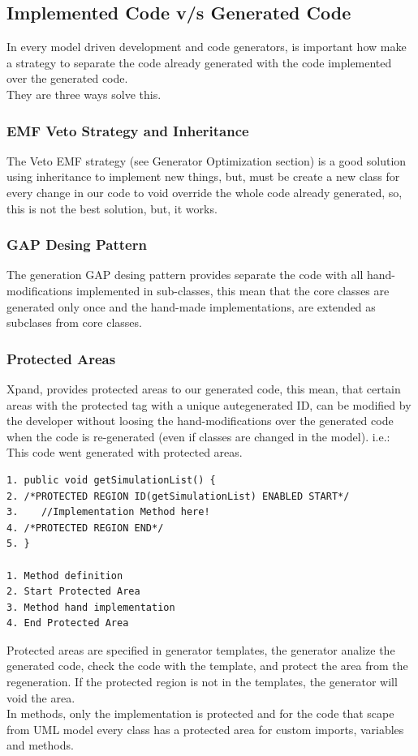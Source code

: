 \subsection{Implemented Code v/s Generated Code}
In every model driven development and code generators, is important how make a
strategy to separate the code already generated with the code implemented over
the generated code.\\
They are three ways solve this.

\subsubsection{EMF Veto Strategy and Inheritance}
The Veto EMF strategy (see Generator Optimization section) is a good solution
using inheritance to implement new things, but, must be create a new class for every change in our code to void
override the whole code already generated, so, this is not the best solution,
but, it works.

\subsubsection{GAP Desing Pattern}
The generation GAP desing pattern provides separate the code with all
hand-modifications implemented in sub-classes, this mean that the core classes
are generated only once and the hand-made implementations, are extended as
subclases from core classes.

\subsubsection{Protected Areas}
Xpand, provides protected areas to our generated code, this mean, that certain
areas with the protected tag with a unique autegenerated ID, can be modified by
the developer without loosing the hand-modifications over the generated code
when the code is re-generated (even if classes are changed in the model).
i.e.: This code went generated with protected areas.
\begin{verbatim}
1. public void getSimulationList() {
2. /*PROTECTED REGION ID(getSimulationList) ENABLED START*/
3.    //Implementation Method here!
4. /*PROTECTED REGION END*/
5. }

1. Method definition
2. Start Protected Area
3. Method hand implementation
4. End Protected Area
\end{verbatim}
Protected areas are specified in generator templates, the generator analize the
generated code, check the code with the template, and protect the area from the
regeneration. If the protected region is not in the templates, the generator
will void the area.\\
In methods, only the implementation is protected and for the code that scape
from UML model every class has a protected area for custom imports, variables and methods.
